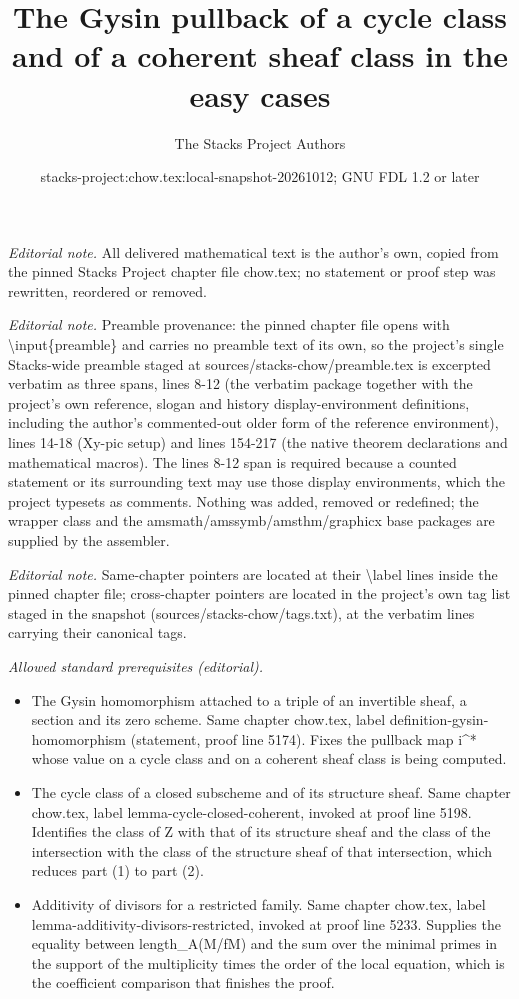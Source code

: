 \documentclass[10pt,a4paper]{amsart}
\title{The Gysin pullback of a cycle class and of a coherent sheaf class in the easy cases}
\author{The Stacks Project Authors}
\date{stacks-project:chow.tex:local-snapshot-20261012; GNU FDL 1.2 or later}
\theoremstyle{plain}
\theoremstyle{definition}
\theoremstyle{remark}
\numberwithin{equation}{subsection}
\begin{document}
\maketitle
\noindent\textit{Editorial note.} All delivered mathematical text is the author's own, copied from the pinned Stacks Project chapter file chow.tex; no statement or proof step was rewritten, reordered or removed.\par\medskip
\noindent\textit{Editorial note.} Preamble provenance: the pinned chapter file opens with \textbackslash{}input\{preamble\} and carries no preamble text of its own, so the project's single Stacks-wide preamble staged at sources/stacks-chow/preamble.tex is excerpted verbatim as three spans, lines 8-12 (the verbatim package together with the project's own reference, slogan and history display-environment definitions, including the author's commented-out older form of the reference environment), lines 14-18 (Xy-pic setup) and lines 154-217 (the native theorem declarations and mathematical macros). The lines 8-12 span is required because a counted statement or its surrounding text may use those display environments, which the project typesets as comments. Nothing was added, removed or redefined; the wrapper class and the amsmath/amssymb/amsthm/graphicx base packages are supplied by the assembler.\par\medskip
\noindent\textit{Editorial note.} Same-chapter pointers are located at their \textbackslash{}label lines inside the pinned chapter file; cross-chapter pointers are located in the project's own tag list staged in the snapshot (sources/stacks-chow/tags.txt), at the verbatim lines carrying their canonical tags.\par\medskip
\noindent\textit{Allowed standard prerequisites (editorial).}\begin{itemize}
\item The Gysin homomorphism attached to a triple of an invertible sheaf, a section and its zero scheme. Same chapter chow.tex, label definition-gysin-homomorphism (statement, proof line 5174). Fixes the pullback map i\textasciicircum{}* whose value on a cycle class and on a coherent sheaf class is being computed.
\item The cycle class of a closed subscheme and of its structure sheaf. Same chapter chow.tex, label lemma-cycle-closed-coherent, invoked at proof line 5198. Identifies the class of Z with that of its structure sheaf and the class of the intersection with the class of the structure sheaf of that intersection, which reduces part (1) to part (2).
\item Additivity of divisors for a restricted family. Same chapter chow.tex, label lemma-additivity-divisors-restricted, invoked at proof line 5233. Supplies the equality between length\_A(M/fM) and the sum over the minimal primes in the support of the multiplicity times the order of the local equation, which is the coefficient comparison that finishes the proof.
\end{itemize}\medskip
\end{document}

